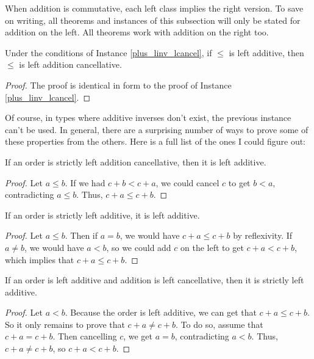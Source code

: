 \documentclass[../../math.tex]{subfiles}
\begin{document}
When addition is commutative, each left class implies the right version.  To
save on writing, all theorems and instances of this subsection will only be
stated for addition on the left.  All theorems work with addition on the right
too.

\begin{instance}
    Under the conditions of Instance \ref{plus_linv_lcancel}, if $\leq$ is left
    additive, then $\leq$ is left addition cancellative.
\end{instance}
\begin{proof}
    The proof is identical in form to the proof of Instance
    \ref{plus_linv_lcancel}.
\end{proof}

Of course, in types where additive inverses don't exist, the previous instance
can't be used.  In general, there are a surprising number of ways to prove some
of these properties from the others.  Here is a full list of the ones I could
figure out:

\begin{instance} \label{le_lplus1}
    If an order is strictly left addition cancellative, then it is left
    additive.
\end{instance}
\begin{proof}
    Let $a \leq b$.  If we had $c + b < c + a$, we could cancel $c$ to get $b <
    a$, contradicting $a \leq b$.  Thus, $c + a \leq c + b$.
\end{proof}

\begin{instance} \label{le_lplus2}
    If an order is strictly left additive, it is left additive.
\end{instance}
\begin{proof}
    Let $a \leq b$.  Then if $a = b$, we would have $c + a \leq c + b$ by
    reflexivity.  If $a \neq b$, we would have $a < b$, so we could add $c$ on
    the left to get $c + a < c + b$, which implies that $c + a \leq c + b$.
\end{proof}

\begin{instance} \label{lt_lplus1}
    If an order is left additive and addition is left cancellative, then it is
    strictly left additive.
\end{instance}
\begin{proof}
    Let $a < b$.  Because the order is left additive, we can get that $c + a
    \leq c + b$.  So it only remains to prove that $c + a \neq c + b$.  To do
    so, assume that $c + a = c + b$.  Then cancelling $c$, we get $a = b$,
    contradicting $a < b$.  Thus, $c + a \neq c + b$, so $c + a < c + b$.
\end{proof}
\end{document}
